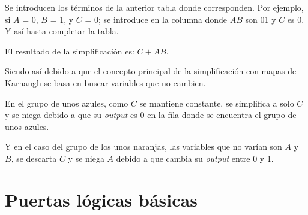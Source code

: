 \documentclass[12pt]{article}
\begin{document}
                Se introducen los términos de la anterior tabla donde corresponden. Por ejemplo, si $A$ = 0, $B$ = 1, y $C$ = 0; se introduce en la columna donde $AB$ son 01 y $C$ es 0. Y así hasta completar la tabla.
                \begin{table}[H]
                \centering
                \caption{Mapa de Karnaugh de la tabla: \ref{tab:verdad} }
                \end{table}

                El resultado de la simplificación es: $\overline{C} + \overline{A}B$. 
                
                Siendo así debido a que el concepto principal de la simplificación con mapas de Karnaugh se basa en buscar variables que no cambien. 
                
                En el grupo de unos azules, como $C$ se mantiene constante, se simplifica a solo $C$ y se niega debido a que su \textit{output} es 0 en la fila donde se encuentra el grupo de unos azules.
                
                Y en el caso del grupo de los unos naranjas, las variables que no varían son $A$ y $B$, se descarta $C$ y se niega $A$ debido a que cambia su \textit{output} entre 0 y 1. 
    \newpage

\section{Puertas lógicas básicas}
\end{document}
